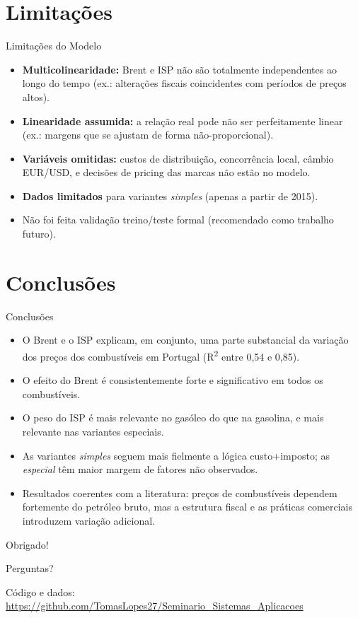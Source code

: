 \documentclass{beamer}
\begin{document}
\section{Limitações}
\begin{frame}{Limitações do Modelo}
  \begin{itemize}
    \item \textbf{Multicolinearidade:} Brent e ISP não são totalmente independentes ao longo do tempo (ex.: alterações fiscais coincidentes com períodos de preços altos).
    \item \textbf{Linearidade assumida:} a relação real pode não ser perfeitamente linear (ex.: margens que se ajustam de forma não-proporcional).
    \item \textbf{Variáveis omitidas:} custos de distribuição, concorrência local, câmbio EUR/USD, e decisões de pricing das marcas não estão no modelo.
    \item \textbf{Dados limitados} para variantes \emph{simples} (apenas a partir de 2015).
    \item Não foi feita validação treino/teste formal (recomendado como trabalho futuro).
  \end{itemize}
\end{frame}

\section{Conclusões}
\begin{frame}{Conclusões}
  \begin{itemize}
    \item O Brent e o ISP explicam, em conjunto, uma parte substancial da variação dos preços dos combustíveis em Portugal (R\textsuperscript{2} entre 0,54 e 0,85).
    \item O efeito do Brent é consistentemente forte e significativo em todos os combustíveis.
    \item O peso do ISP é mais relevante no gasóleo do que na gasolina, e mais relevante nas variantes especiais.
    \item As variantes \emph{simples} seguem mais fielmente a lógica custo+imposto; as \emph{especial} têm maior margem de fatores não observados.
    \item Resultados coerentes com a literatura: preços de combustíveis dependem fortemente do petróleo bruto, mas a estrutura fiscal e as práticas comerciais introduzem variação adicional.
  \end{itemize}
\end{frame}

\begin{frame}
  \centering
  \Huge{Obrigado!}

  \vspace{0.5cm}
  \Large{Perguntas?}

  \vspace{0.8cm}
  \normalsize{Código e dados: \url{https://github.com/TomasLopes27/Seminario_Sistemas_Aplicacoes}}
\end{frame}
\end{document}
